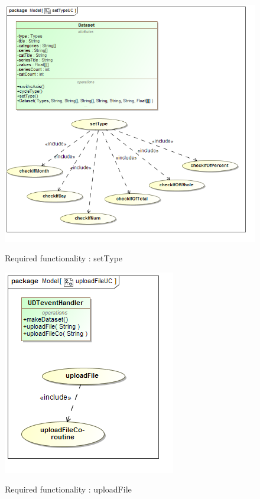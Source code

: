 \documentclass[a4paper,12pt]{article}
\begin{document}
	\begin{figure}[H]
		\includegraphics[width=\textwidth]{Images/setTypeUC.png}  \\
		\caption{Required functionality : setType}
	\end{figure}
	
	\begin{figure}[H]
		\includegraphics[width=\textwidth]{Images/uploadFileUC.png}  \\
		\caption{Required functionality : uploadFile}
	\end{figure}
	
\end{document}
